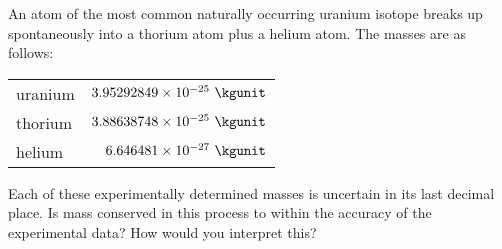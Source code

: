 An atom of the most common naturally occurring uranium isotope breaks up spontaneously
        into a thorium atom plus a helium atom. The masses are as follows:

        \begin{tabular}{lr}
                uranium        & $3.95292849\times 10^{-25}\ \kgunit$ \\
                thorium & $3.88638748\times 10^{-25}\ \kgunit$ \\
                helium & $6.646481\times 10^{-27}\ \kgunit$ \\
        \end{tabular}

        \noindent{}Each of these experimentally determined masses is uncertain in its last decimal
        place. Is mass conserved in this process to within the accuracy of the experimental
        data? How would you interpret this?
